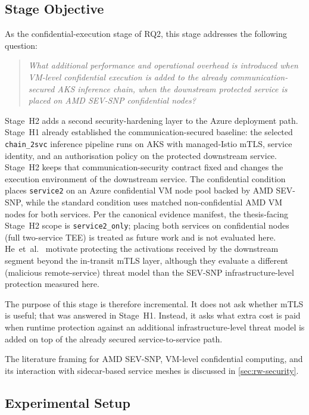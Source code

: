 \subsection{Stage Objective}

As the confidential-execution stage of RQ2, this stage addresses the following question:

\begin{quote}
\textit{What additional performance and operational overhead is introduced when
VM-level confidential execution is added to the already communication-secured
AKS inference chain, when the downstream protected service is placed on AMD
SEV-SNP confidential nodes?}
\end{quote}

Stage~H2 adds a second security-hardening layer to the Azure deployment path. Stage~H1
already established the communication-secured baseline: the selected
\texttt{chain\_2svc} inference pipeline runs on AKS with managed-Istio mTLS,
service identity, and an authorisation policy on the protected downstream
service. Stage~H2 keeps that communication-security contract fixed and changes the
execution environment of the downstream service. The confidential condition
places \texttt{service2} on an Azure confidential VM node pool backed by AMD
SEV-SNP, while the standard condition uses matched non-confidential AMD VM
nodes for both services. Per the canonical evidence manifest, the
thesis-facing Stage~H2 scope is \texttt{service2\_only}; placing both services on
confidential nodes (full two-service TEE) is treated as future work and is not
evaluated here. He~et~al.~\cite{he2021_attacking_collaborative} motivate
protecting the activations received by the downstream segment beyond the
in-transit mTLS layer, although they evaluate a different (malicious
remote-service) threat model than the SEV-SNP infrastructure-level protection
measured here.

The purpose of this stage is therefore incremental. It does not ask whether
mTLS is useful; that was answered in Stage~H1. Instead, it asks what extra cost is
paid when runtime protection against an additional infrastructure-level threat model is
added on top of the already secured service-to-service path.

The literature framing for AMD SEV-SNP, VM-level confidential computing, and
its interaction with sidecar-based service meshes is discussed in
\cref{sec:rw-security}.

\subsection{Experimental Setup}


